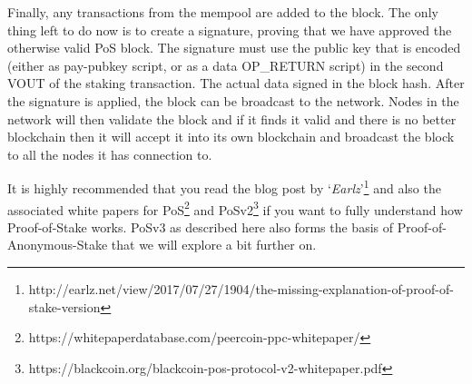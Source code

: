 Finally, any transactions from the mempool are added to the block. The only
thing left to do now is to create a signature, proving that we have approved
the otherwise valid PoS block. The signature must use the public key that is
encoded (either as pay-pubkey script, or as a data OP\_RETURN script) in the
second VOUT of the staking transaction. The actual data signed in the block
hash. After the signature is applied, the block can be broadcast to the
network. Nodes in the network will then validate the block and if it finds
it valid and there is no better blockchain then it will accept it into its
own blockchain and broadcast the block to all the nodes it has connection to.



It is highly recommended that you read the blog post by
‘\textit{Earlz}’\footnote{http://earlz.net/view/2017/07/27/1904/the-missing-explanation-of-proof-of-stake-version}
and also the associated white papers for
PoS\footnote{https://whitepaperdatabase.com/peercoin-ppc-whitepaper/} and
PoSv2\footnote{https://blackcoin.org/blackcoin-pos-protocol-v2-whitepaper.pdf}
if you want to fully understand how Proof-of-Stake works. PoSv3 as described
here also forms the basis of Proof-of-Anonymous-Stake that we will explore a
bit further on.
